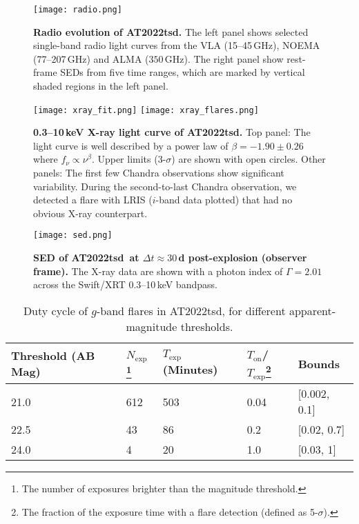 \documentclass{nature_plusfigure}
\newcommand{\at}{AT2022tsd}
\begin{document}
\begin{extended_data}
\begin{figure}[!ht]
 \centering
\texttt{[image: radio.png]}
  \caption{\textbf{Radio evolution of \at.} The left panel shows selected single-band radio light curves from the VLA (15--45\,GHz), NOEMA (77--207\,GHz) and ALMA ($350$\,GHz). The right panel show rest-frame SEDs from five time ranges, which are marked by vertical shaded regions in the left panel.}
 \label{fig:radio}
\end{figure}

\begin{figure}[!ht]
 \centering
\texttt{[image: xray\_fit.png]}
\texttt{[image: xray\_flares.png]}
  \caption{\textbf{0.3--10\,keV X-ray light curve of \at.} Top panel: The light curve is well described by a power law of $\beta=-1.90\pm0.26$ where $f_\nu \propto \nu^{\beta}$. Upper limits (3-$\sigma$) are shown with open circles. Other panels: The first few Chandra observations show significant variability. During the second-to-last Chandra observation, we detected a flare with LRIS ($i$-band data plotted) that had no obvious X-ray counterpart.}
 \label{fig:xray-lc}
\end{figure}


\begin{figure}[!ht]
 \centering
\texttt{[image: sed.png]}
  \caption{\textbf{SED of \at\ at $\Delta t\approx30\,$d post-explosion (observer frame).} The X-ray data are shown with a photon index of $\Gamma=2.01$ across the Swift/XRT 0.3--10\,keV bandpass.}
 \label{fig:full-sed}
\end{figure}

\begin{center} 
\begin{longtable}{lllll} 
\caption{Duty cycle of $g$-band flares in \at, for different apparent-magnitude thresholds.} 
\label{tab:flare-stats}\\ 
\hline\hline
Threshold (AB Mag) & $N_\mathrm{exp}$\footnote{The number of exposures brighter than the magnitude threshold.} & $T_\mathrm{exp}$ (Minutes) & $T_\mathrm{on}$/$T_\mathrm{exp}$\footnote{The fraction of the exposure time with a flare detection (defined as 5-$\sigma$).} & Bounds \\
\hline
21.0 & 612 & 503 & 0.04 & [0.002, 0.1] \\
22.5 & 43 & 86 & 0.2 & [0.02, 0.7]  \\
24.0 & 4 & 20 & 1.0 & [0.03, 1] \\
\hline \hline
\end{longtable}
\end{center}

\end{extended_data}
\end{document}
